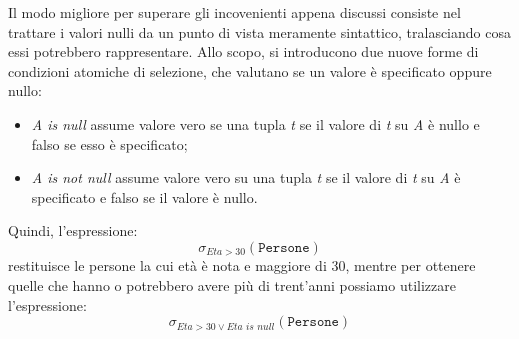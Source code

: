 \documentclass[12pt]{report}
\begin{document}
 	Il modo migliore per superare gli incovenienti appena discussi consiste nel trattare i valori nulli da un punto di vista meramente sintattico, tralasciando cosa essi potrebbero rappresentare. Allo scopo, si introducono due nuove forme di condizioni atomiche di selezione, che valutano se un valore è specificato oppure nullo:
 	\begin{itemize}
 		\item \textit{A is null} assume valore vero se una tupla \textit{t} se il valore di \textit{t} su \textit{A} è nullo e falso se esso è specificato;
 		\item \textit{A is not null} assume valore vero su una tupla \textit{t} se il valore di \textit{t}  su \textit{A} è specificato e falso se il valore è nullo.
 	\end{itemize}
 	Quindi, l'espressione:
 	\[
 	\sigma_{Eta > 30}(\texttt{Persone})
 	\]
 	restituisce le persone la cui età è nota e maggiore di 30, mentre per ottenere quelle che hanno o potrebbero avere più di trent'anni possiamo utilizzare l'espressione:
 	\[
 	\sigma_{Eta > 30 \vee \textit{Eta is null}}(\texttt{Persone})
 	\]
\end{document}
